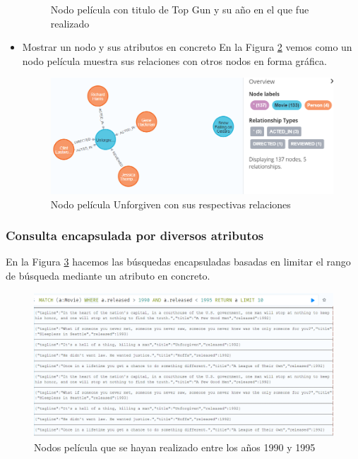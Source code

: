 \begin{itemize}
\begin{figure}[H]
    \caption{Nodo película con titulo de Top Gun y su año en el que fue realizado}
    \label{fig:match_2}
    \end{figure}
    \item Mostrar un nodo y sus atributos en concreto
    En la Figura \ref{fig:att} vemos como un nodo película muestra sus relaciones con otros nodos en forma gráfica.
    \begin{figure}[H]
    \centering
    \includegraphics[scale=0.5]{Graficos/att.png}
    \caption{Nodo película Unforgiven con sus respectivas relaciones}
    \label{fig:att}
    \end{figure}
\end{itemize}
\subsubsection{Consulta encapsulada por diversos atributos}
En la Figura \ref{fig:peli} hacemos las búsquedas encapsuladas basadas en limitar el rango de búsqueda mediante un atributo en concreto.
\begin{figure}[H]
    \centering
    \includegraphics[scale=0.4]{Graficos/peli.png}
    \caption{Nodos película que se hayan realizado entre los años 1990 y 1995}
    \label{fig:peli}
\end{figure}
